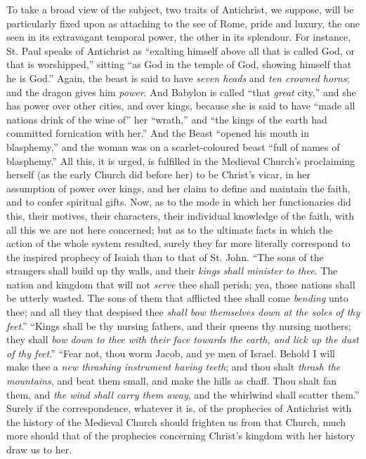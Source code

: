 To take a broad view of the subject, two traits of Antichrist, we
suppose, will be particularly fixed upon as attaching to the see of
Rome, pride and luxury, the one seen in its extravagant temporal
power, the other in its splendour. For instance, St. Paul speaks of
Antichrist as ``exalting himself above all that is called God, or
that is worshipped,'' sitting ``as God in the temple of God,
showing himself that he is God.'' Again, the beast is said
to have \emph{seven heads} and \emph{ten crowned horns}; and the dragon gives him
\emph{power}. And Babylon is called ``that \emph{great} city,'' and she has
power over other cities, and over kings, because she is said to have
``made all nations drink of the wine of'' her
``wrath,'' and ``the kings of the earth had committed
fornication with her.'' And the Beast ``opened his mouth in
blasphemy,'' and the woman was on a scarlet-coloured beast
``full of names of blasphemy.'' All this, it is urged, is
fulfilled in the Medieval Church's proclaiming herself (as the early
Church did before her) to be Christ's vicar, in her assumption of
power over kings, and her claim to define and maintain the faith, and
to confer spiritual gifts. Now, as to the mode in which her
functionaries did this, their motives, their characters, their
individual knowledge of the faith, with all this we are not here
concerned; but as to the ultimate facts in which the action of the
whole system resulted, surely they far more literally correspond to
the inspired prophecy of Isaiah than to that of St. John. ``The
sons of the strangers shall build up thy walls, and their \emph{kings
shall minister to thee}. The nation and kingdom that will not \emph{serve}
thee shall perish; yea, those nations shall be utterly wasted. The
sons of them that afflicted thee shall come \emph{bending} unto thee;
and all they that despised thee \emph{shall bow themselves down at the
soles of thy feet}.'' ``Kings shall be thy nursing fathers,
and their queens thy nursing mothers; they shall \emph{bow down to thee
with their face towards the earth, and lick up the dust of thy feet}.''
``Fear not, thou worm Jacob, and ye men of Israel. Behold I will
make thee a \emph{new thrashing instrument having teeth}; and thou
shalt \emph{thrash the mountains}, and beat them small, and make the
hills as chaff. Thou shalt fan them, and \emph{the wind shall carry them
away}, and the whirlwind shall scatter them.'' Surely if
the correspondence, whatever it is, of the prophecies of Antichrist
with the history of the Medieval Church should frighten us from that
Church, much more should that of the prophecies concerning Christ's
kingdom with her history draw us to her.


